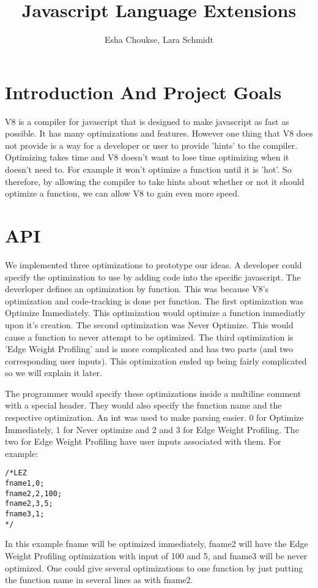 \documentclass[twocolumn,showpacs,%
  nofootinbib,aps,superscriptaddress,%
  eqsecnum,prd,notitlepage,showkeys,10pt]{revtex4-1}
\begin{document}
\title{Javascript Language Extensions}
\author{Esha Choukse, Lara Schmidt}


\maketitle

\section{Introduction And Project Goals} 
V8 is a compiler for javascript that is designed to make javascript as fast as possible. It has many optimizations and features. However one thing that V8 does not provide is a way for a developer or user to provide 'hints' to the compiler. Optimizing takes time and V8 doesn't want to lose time optimizing when it doesn't need to. For example it won't optimize a function until it is 'hot'. So therefore, by allowing the compiler to take hints about whether or not it should optimize a function, we can allow V8 to gain even more speed.

\section{API}
We implemented three optimizations to prototype our ideas. A developer could specify the optimization to use by adding code into the specific javascript. The deverloper defines an optimization by function. This was because V8's optimization and code-tracking is done per function. The first optimization was Optimize Immediately. This optimization would optimize a function immediatly upon it's creation. The second optimization was Never Optimize. This would cause a function to never attempt to be optimized. The third optimization is 'Edge Weight Profiling' and is more complicated and has two parts (and two corresponding user inputs). This optimization ended up being fairly complicated so we will explain it later.

The programmer would specify these optimizations inside a multiline comment with a special header. They would also specify the function name and the respective optimization. An int was used to make parsing easier. 0 for Optimize Immediately, 1 for Never optimize and 2 and 3 for Edge Weight Profiling. The two for Edge Weight Profiling have user inputs associated with them. For example:
\begin{lstlisting}
/*LEZ
fname1,0;
fname2,2,100;
fname2,3,5;
fname3,1;
*/
\end{lstlisting}
In this example fname will be optimized immediately, fname2 will have the Edge Weight Profiling optimization with input of 100 and 5, and fname3 will be never optimized. One could give several optimizations to one function by just putting the function name in several lines as with fname2.
\end{document}
